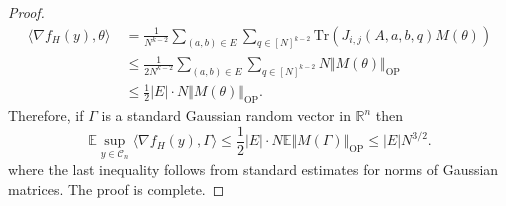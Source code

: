 \documentclass[12pt]{article}
\def \RR {\mathbb R}
\def \EE {\mathbb E}
\def \tr {\mathrm{Tr}}
\def \DC {\mathcal{C}_n}
\theoremstyle{definition}
\theoremstyle{remark}
\begin{document}
\begin{proof}
	\begin{align*}
	\langle \nabla f_H(y), \theta \rangle ~& = \frac{1}{N^{k-2}} \sum_{(a,b) \in E} \sum_{q \in [N]^{k-2}} \tr(J_{i,j}(A,a,b,q) M(\theta)) \\
	& \leq \frac{1}{2 N^{k-2}} \sum_{(a,b) \in E} \sum_{q \in [N]^{k-2}} N \Vert M(\theta) \Vert_{\mathrm{OP}} \\
	& \leq \frac{1}{2}|E| \cdot N \Vert M(\theta) \Vert_{\mathrm{OP}}.
	\end{align*}
	Therefore, if $\Gamma$ is a standard Gaussian random vector in $\RR^n$ then
	$$
	\EE \sup_{y \in \DC} \langle \nabla f_H(y), \Gamma \rangle \leq  \frac{1}{2}|E| \cdot N \EE \Vert M(\Gamma) \Vert_{\mathrm{OP}} \leq |E| N^{3/2}.
	$$
	where the last inequality follows from standard estimates for norms of Gaussian matrices. The proof is complete.
\end{proof}
\end{document}
